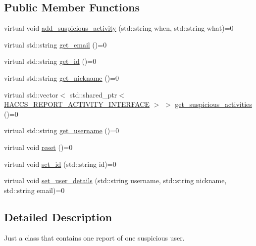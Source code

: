 \subsection*{Public Member Functions}
\begin{DoxyCompactItemize}
\item 
virtual void \hyperlink{classAsteroids_1_1Domain_1_1Server_1_1HACCS__REPORT__INTERFACE_aa9f992ed1f3748412fb9bd6521d8f3ff}{add\+\_\+suspicious\+\_\+activity} (std\+::string when, std\+::string what)=0
\item 
virtual std\+::string \hyperlink{classAsteroids_1_1Domain_1_1Server_1_1HACCS__REPORT__INTERFACE_a766b8de53dfc16a5598d64012ba2564c}{get\+\_\+email} ()=0
\item 
virtual std\+::string \hyperlink{classAsteroids_1_1Domain_1_1Server_1_1HACCS__REPORT__INTERFACE_a7d7aa92456e0a24475b8618d066ffd63}{get\+\_\+id} ()=0
\item 
virtual std\+::string \hyperlink{classAsteroids_1_1Domain_1_1Server_1_1HACCS__REPORT__INTERFACE_a75c843246909be0ab1f8ecd7ac4fd3e8}{get\+\_\+nickname} ()=0
\item 
virtual std\+::vector$<$ std\+::shared\+\_\+ptr$<$ \hyperlink{classAsteroids_1_1Domain_1_1Server_1_1HACCS__REPORT__ACTIVITY__INTERFACE}{H\+A\+C\+C\+S\+\_\+\+R\+E\+P\+O\+R\+T\+\_\+\+A\+C\+T\+I\+V\+I\+T\+Y\+\_\+\+I\+N\+T\+E\+R\+F\+A\+CE} $>$ $>$ \hyperlink{classAsteroids_1_1Domain_1_1Server_1_1HACCS__REPORT__INTERFACE_a306c6c10a5d4a5ab886c32ad7e330b14}{get\+\_\+suspicious\+\_\+activities} ()=0
\item 
virtual std\+::string \hyperlink{classAsteroids_1_1Domain_1_1Server_1_1HACCS__REPORT__INTERFACE_a74bc89d7ffac8ef6825fa08a136ea818}{get\+\_\+username} ()=0
\item 
virtual void \hyperlink{classAsteroids_1_1Domain_1_1Server_1_1HACCS__REPORT__INTERFACE_a910f7fdcd75d49a01cea298881a7e089}{reset} ()=0
\item 
virtual void \hyperlink{classAsteroids_1_1Domain_1_1Server_1_1HACCS__REPORT__INTERFACE_a3c7f14b37674ab2849164e7b990ea7bf}{set\+\_\+id} (std\+::string id)=0
\item 
virtual void \hyperlink{classAsteroids_1_1Domain_1_1Server_1_1HACCS__REPORT__INTERFACE_a95473ef5b5fca37905848f8e6d627d60}{set\+\_\+user\+\_\+details} (std\+::string username, std\+::string nickname, std\+::string email)=0
\end{DoxyCompactItemize}


\subsection{Detailed Description}
Just a class that contains one report of one suspicious user. 

